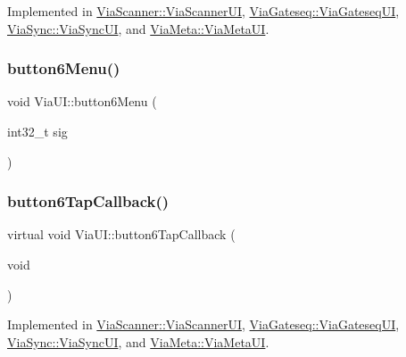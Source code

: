 Implemented in \mbox{\hyperlink{class_via_scanner_1_1_via_scanner_u_i_af2cd0e1ac72f9486aa152b1d69bec8c8}{Via\+Scanner\+::\+Via\+Scanner\+UI}}, \mbox{\hyperlink{class_via_gateseq_1_1_via_gateseq_u_i_ae16a0091338c515aa625c8738de1752b}{Via\+Gateseq\+::\+Via\+Gateseq\+UI}}, \mbox{\hyperlink{class_via_sync_1_1_via_sync_u_i_ace582870350424e071fc6ddb87efd802}{Via\+Sync\+::\+Via\+Sync\+UI}}, and \mbox{\hyperlink{class_via_meta_1_1_via_meta_u_i_a793ad6aff954aeefd91a070d1a65c9d1}{Via\+Meta\+::\+Via\+Meta\+UI}}.

\mbox{\label{class_via_u_i_aed3d9b75b2d67b17a5596597aa59cf26}} 
\subsubsection{\texorpdfstring{button6\+Menu()}{button6Menu()}}
{\footnotesize\ttfamily void Via\+U\+I\+::button6\+Menu (\begin{DoxyParamCaption}\item[{int32\+\_\+t}]{sig }\end{DoxyParamCaption})}

\mbox{\label{class_via_u_i_a8a6bf29d336faa8e9d026a84be45d956}} 
\subsubsection{\texorpdfstring{button6\+Tap\+Callback()}{button6TapCallback()}}
{\footnotesize\ttfamily virtual void Via\+U\+I\+::button6\+Tap\+Callback (\begin{DoxyParamCaption}\item[{void}]{ }\end{DoxyParamCaption})\hspace{0.3cm}{\ttfamily [pure virtual]}}



Implemented in \mbox{\hyperlink{class_via_scanner_1_1_via_scanner_u_i_a2d8bc6b636e934c0945a09e115476ec3}{Via\+Scanner\+::\+Via\+Scanner\+UI}}, \mbox{\hyperlink{class_via_gateseq_1_1_via_gateseq_u_i_a745d2eed3bc66bd2bb44149cb54cbd39}{Via\+Gateseq\+::\+Via\+Gateseq\+UI}}, \mbox{\hyperlink{class_via_sync_1_1_via_sync_u_i_a553dc53213d1b4b62d7aead58533c511}{Via\+Sync\+::\+Via\+Sync\+UI}}, and \mbox{\hyperlink{class_via_meta_1_1_via_meta_u_i_a8b8724e5d68649da49f3f99203257833}{Via\+Meta\+::\+Via\+Meta\+UI}}.

